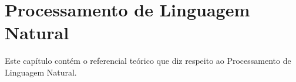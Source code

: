 \clearpage
\chapter{Processamento de Linguagem Natural}
\label{cha:pln}

Este capítulo contém o referencial teórico que diz respeito ao Processamento de Linguagem Natural.



